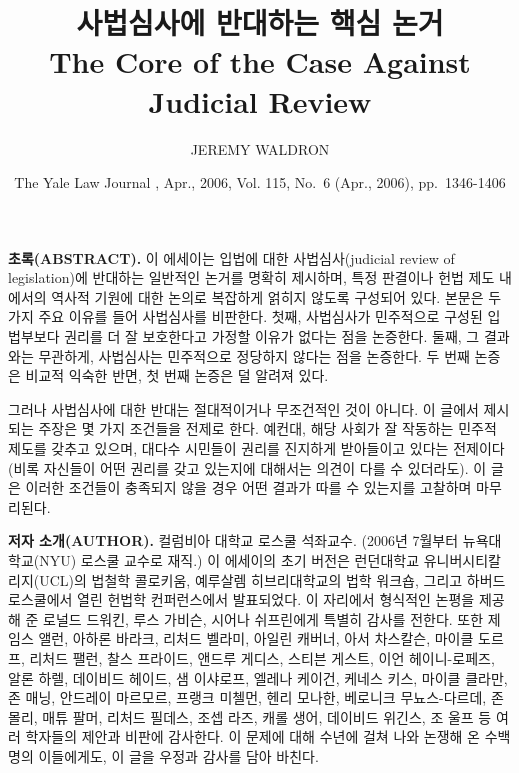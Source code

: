 \documentclass[a4paper,12pt,oneside]{article}  %
\title{\Huge\textsc{사법심사에 반대하는 핵심 논거} \\[2ex] \Large The Core of the Case Against Judicial Review}
\author{\Large JEREMY WALDRON}
\date{\small The Yale Law Journal , Apr., 2006, Vol. 115, No.~6 (Apr., 2006),
pp.~1346-1406}
\begin{document}
\begin{titlepage}
  \centering
  \vspace*{3cm}
  {\Huge\textsc{사법심사에 반대하는 핵심 논거}}\\[1.5ex]
  {\textsc{제레미 월드런 (JEREMY WALDRON)}\\[6ex]
  {\small 2025 소논문 특강 강의용 한국어판\\
  강좌 외의 사용을 불허함}
  \vfill
\end{titlepage}


\maketitle

\newpage

\textbf{초록(ABSTRACT).} 이 에세이는 입법에 대한 사법심사(judicial
review of legislation)에 반대하는 일반적인 논거를 명확히 제시하며, 특정
판결이나 헌법 제도 내에서의 역사적 기원에 대한 논의로 복잡하게 얽히지
않도록 구성되어 있다. 본문은 두 가지 주요 이유를 들어 사법심사를
비판한다. 첫째, 사법심사가 민주적으로 구성된 입법부보다 권리를 더 잘
보호한다고 가정할 이유가 없다는 점을 논증한다. 둘째, 그 결과와는
무관하게, 사법심사는 민주적으로 정당하지 않다는 점을 논증한다. 두 번째
논증은 비교적 익숙한 반면, 첫 번째 논증은 덜 알려져 있다.

그러나 사법심사에 대한 반대는 절대적이거나 무조건적인 것이 아니다. 이
글에서 제시되는 주장은 몇 가지 조건들을 전제로 한다. 예컨대, 해당 사회가
잘 작동하는 민주적 제도를 갖추고 있으며, 대다수 시민들이 권리를 진지하게
받아들이고 있다는 전제이다(비록 자신들이 어떤 권리를 갖고 있는지에
대해서는 의견이 다를 수 있더라도). 이 글은 이러한 조건들이 충족되지 않을
경우 어떤 결과가 따를 수 있는지를 고찰하며 마무리된다.

\vspace{\baselineskip}

\textbf{저자 소개(AUTHOR).} 컬럼비아 대학교 로스쿨 석좌교수. (2006년
7월부터 뉴욕대학교(NYU) 로스쿨 교수로 재직.) 이 에세이의 초기 버전은
런던대학교 유니버시티칼리지(UCL)의 법철학 콜로키움, 예루살렘
히브리대학교의 법학 워크숍, 그리고 하버드 로스쿨에서 열린 헌법학
컨퍼런스에서 발표되었다. 이 자리에서 형식적인 논평을 제공해 준 로널드
드워킨, 루스 가비슨, 시어나 쉬프린에게 특별히 감사를 전한다. 또한 제임스
앨런, 아하론 바라크, 리처드 벨라미, 아일린 캐버너, 아서 차스칼슨, 마이클
도르프, 리처드 팰런, 찰스 프라이드, 앤드루 게디스, 스티븐 게스트, 이언
헤이니-로페즈, 알론 하렐, 데이비드 헤이드, 샘 이샤로프, 엘레나 케이건,
케네스 키스, 마이클 클라만, 존 매닝, 안드레이 마르모르, 프랭크 미첼먼,
헨리 모나한, 베로니크 무뇨스-다르데, 존 몰리, 매튜 팔머, 리처드 필데스,
조셉 라즈, 캐롤 생어, 데이비드 위긴스, 조 울프 등 여러 학자들의 제안과
비판에 감사한다. 이 문제에 대해 수년에 걸쳐 나와 논쟁해 온 수백 명의
이들에게도, 이 글을 우정과 감사를 담아 바친다.
\end{document}
